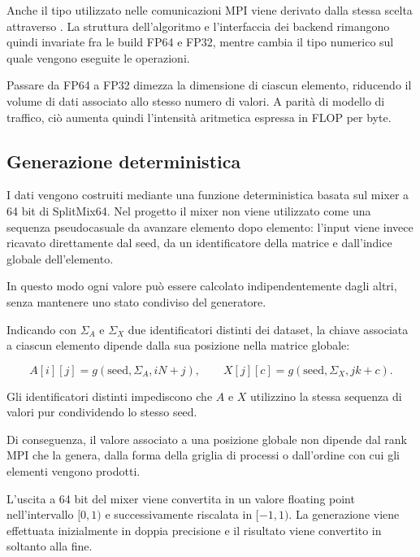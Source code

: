 Anche il tipo utilizzato nelle comunicazioni MPI viene derivato dalla stessa
scelta attraverso . La struttura dell'algoritmo e
l'interfaccia dei backend rimangono quindi invariate fra le build FP64 e
FP32, mentre cambia il tipo numerico sul quale vengono eseguite le
operazioni.

Passare da FP64 a FP32 dimezza la dimensione di ciascun elemento,
riducendo il volume di dati associato allo stesso numero di valori.
A parità di modello di traffico, ciò aumenta quindi l'intensità aritmetica
espressa in FLOP per byte.

\subsection{Generazione deterministica}

I dati vengono costruiti mediante una funzione deterministica basata sul
mixer a 64 bit di SplitMix64. Nel progetto il mixer non viene utilizzato
come una sequenza pseudocasuale da avanzare elemento dopo elemento:
l'input viene invece ricavato direttamente dal seed, da un identificatore
della matrice e dall'indice globale dell'elemento.

In questo modo ogni valore può essere calcolato indipendentemente dagli
altri, senza mantenere uno stato condiviso del generatore.

Indicando con $\Sigma_A$ e $\Sigma_X$ due identificatori distinti dei
dataset, la chiave associata a ciascun elemento dipende dalla sua posizione
nella matrice globale:

\begin{equation}
A[i][j]
=
g\!\left(\text{seed},\Sigma_A,iN+j\right),
\qquad
X[j][c]
=
g\!\left(\text{seed},\Sigma_X,jk+c\right).
\label{eq:gen}
\end{equation}

Gli identificatori distinti impediscono che $A$ e $X$ utilizzino la stessa
sequenza di valori pur condividendo lo stesso seed.

Di conseguenza, il valore associato a una posizione globale non dipende
dal rank MPI che la genera, dalla forma della griglia di processi o
dall'ordine con cui gli elementi vengono prodotti.

L'uscita a 64 bit del mixer viene convertita in un valore floating point
nell'intervallo $[0,1)$ e successivamente riscalata in $[-1,1)$.
La generazione viene effettuata inizialmente in doppia precisione e il
risultato viene convertito in  soltanto alla fine.

